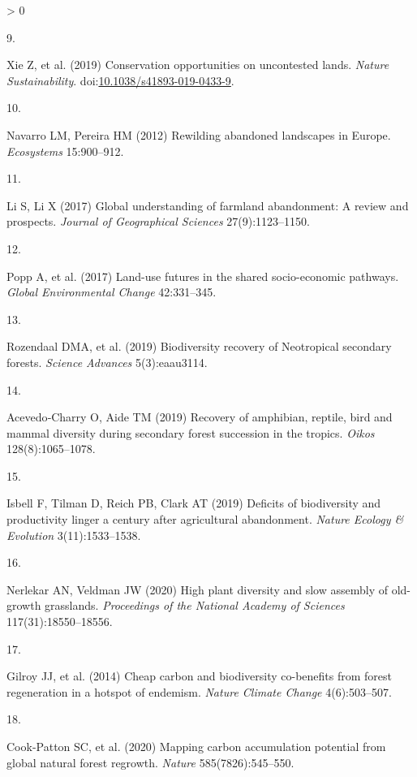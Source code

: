 \documentclass[9pt,twocolumn,twoside,]{pnas-new}
\newlength{\csllabelwidth}
\newlength{\cslhangindent}
\newenvironment{CSLReferences}[2] %
 {%
  \setlength{\parindent}{0pt}
  \ifodd #1 \everypar{\setlength{\hangindent}{\cslhangindent}}\ignorespaces\fi
  \ifnum #2 > 0
  \setlength{\parskip}{#2\baselineskip}
  \fi
 }%
 {}
\newcommand{\CSLLeftMargin}[1]{\parbox[t]{\csllabelwidth}{#1}}
\newcommand{\CSLRightInline}[1]{\parbox[t]{\linewidth - \csllabelwidth}{#1}\break}
\begin{document}
\begin{CSLReferences}{0}{0}
\leavevmode\hypertarget{ref-Xie2019}{}%
\CSLLeftMargin{9. }
\CSLRightInline{Xie Z, et al. (2019) {Conservation opportunities on uncontested lands}. \emph{Nature Sustainability}. doi:\href{https://doi.org/10.1038/s41893-019-0433-9}{10.1038/s41893-019-0433-9}.}

\leavevmode\hypertarget{ref-Navarro2012}{}%
\CSLLeftMargin{10. }
\CSLRightInline{Navarro LM, Pereira HM (2012) {Rewilding abandoned landscapes in Europe}. \emph{Ecosystems} 15:900--912.}

\leavevmode\hypertarget{ref-Li2017}{}%
\CSLLeftMargin{11. }
\CSLRightInline{Li S, Li X (2017) {Global understanding of farmland abandonment: A review and prospects}. \emph{Journal of Geographical Sciences} 27(9):1123--1150.}

\leavevmode\hypertarget{ref-Popp2017}{}%
\CSLLeftMargin{12. }
\CSLRightInline{Popp A, et al. (2017) {Land-use futures in the shared socio-economic pathways}. \emph{Global Environmental Change} 42:331--345.}

\leavevmode\hypertarget{ref-Rozendaal2019}{}%
\CSLLeftMargin{13. }
\CSLRightInline{Rozendaal DMA, et al. (2019) {Biodiversity recovery of Neotropical secondary forests}. \emph{Science Advances} 5(3):eaau3114.}

\leavevmode\hypertarget{ref-Acevedo-Charry2019}{}%
\CSLLeftMargin{14. }
\CSLRightInline{Acevedo‐Charry O, Aide TM (2019) {Recovery of amphibian, reptile, bird and mammal diversity during secondary forest succession in the tropics}. \emph{Oikos} 128(8):1065--1078.}

\leavevmode\hypertarget{ref-Isbell2019}{}%
\CSLLeftMargin{15. }
\CSLRightInline{Isbell F, Tilman D, Reich PB, Clark AT (2019) {Deficits of biodiversity and productivity linger a century after agricultural abandonment}. \emph{Nature Ecology {\&} Evolution} 3(11):1533--1538.}

\leavevmode\hypertarget{ref-Nerlekar2020}{}%
\CSLLeftMargin{16. }
\CSLRightInline{Nerlekar AN, Veldman JW (2020) {High plant diversity and slow assembly of old-growth grasslands}. \emph{Proceedings of the National Academy of Sciences} 117(31):18550--18556.}

\leavevmode\hypertarget{ref-Gilroy2014}{}%
\CSLLeftMargin{17. }
\CSLRightInline{Gilroy JJ, et al. (2014) {Cheap carbon and biodiversity co-benefits from forest regeneration in a hotspot of endemism}. \emph{Nature Climate Change} 4(6):503--507.}

\leavevmode\hypertarget{ref-Cook-Patton2020}{}%
\CSLLeftMargin{18. }
\CSLRightInline{Cook-Patton SC, et al. (2020) {Mapping carbon accumulation potential from global natural forest regrowth}. \emph{Nature} 585(7826):545--550.}


\end{CSLReferences}
\end{document}
